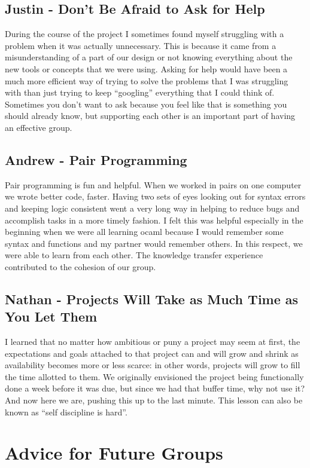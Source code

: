 \subsection{Justin - Don't Be Afraid to Ask for Help}
During the course of the project I sometimes found myself struggling with a problem when it was actually unnecessary. This is because it came from a misunderstanding of a part of our design or not knowing everything about the new tools or concepts that we were using. Asking for help would have been a much more efficient way of trying to solve the problems that I was struggling with than just trying to keep ``googling'' everything that I could think of. Sometimes you don't want to ask because you feel like that is something you should already know, but supporting each other is an important part of having an effective group.

\subsection{Andrew - Pair Programming}
Pair programming is fun and helpful. When we worked in pairs on one computer we wrote better code, faster. Having two sets of eyes looking out for syntax errors and keeping logic consistent went a very long way in helping to reduce bugs and accomplish tasks in a more timely fashion. I felt this was helpful especially in the beginning when we were all learning ocaml because I would remember some syntax and functions and my partner would remember others. In this respect, we were able to learn from each other. The knowledge transfer experience contributed to the cohesion of our group.

\subsection{Nathan - Projects Will Take as Much Time as You Let Them}
I learned that no matter how ambitious or puny a project may seem at
first, the expectations and goals attached to that project can and
will grow and shrink as availability becomes more or less scarce: in
other words, projects will grow to fill the time allotted to them. We
originally envisioned the project being functionally done a week
before it was due, but since we had that buffer time, why not use it?
And now here we are, pushing this up to the last minute. This lesson
can also be known as ``self discipline is hard''.

\section{Advice for Future Groups}

